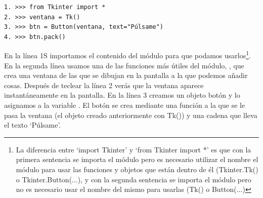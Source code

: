 \begin{listing}
\begin{verbatim}
1. >>> from Tkinter import *
2. >>> ventana = Tk()
3. >>> btn = Button(ventana, text="Púlsame")
4. >>> btn.pack()
\end{verbatim}
\end{listing}

En la línea 1S importamos el contenido del módulo  para que podamos usarlos\footnote{La diferencia entre `import Tkinter' y `from Tkinter import *' es que con la primera sentencia se importa el módulo pero es necesario utilizar el nombre el módulo para usar las funciones y objetos que están dentro de él (Tkinter.Tk() o Tkinter.Button($\ldots$), y con la segunda sentencia se importa el módulo pero no es necesario usar el nombre del mismo para usarlas (Tk() o Button($\ldots$)}. En la segunda línea usamos una de las funciones más útiles del módulo, , que crea una ventana de las que se dibujan en la pantalla a la que podemos añadir cosas.  Después de teclear la línea 2 verás que la ventana aparece instantáneamente en la pantalla. En la línea 3 creamos un objeto botón y lo asignamos a la variable .  El botón se crea mediante una función a la que se le pasa la ventana (el objeto creado anteriormente con Tk()) y una cadena que lleva el texto `Púlsame'.

\par
{}
\par

